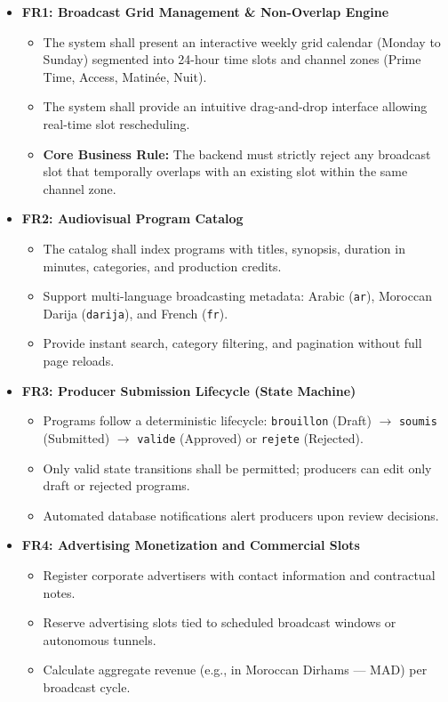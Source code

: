 \documentclass[12pt,a4paper,oneside]{report}
\begin{document}
\begin{itemize}
    \item \textbf{FR1: Broadcast Grid Management \& Non-Overlap Engine}
    \begin{itemize}
        \item The system shall present an interactive weekly grid calendar (Monday to Sunday) segmented into 24-hour time slots and channel zones (Prime Time, Access, Matinée, Nuit).
        \item The system shall provide an intuitive drag-and-drop interface allowing real-time slot rescheduling.
        \item \textbf{Core Business Rule:} The backend must strictly reject any broadcast slot that temporally overlaps with an existing slot within the same channel zone.
    \end{itemize}

    \item \textbf{FR2: Audiovisual Program Catalog}
    \begin{itemize}
        \item The catalog shall index programs with titles, synopsis, duration in minutes, categories, and production credits.
        \item Support multi-language broadcasting metadata: Arabic (\texttt{ar}), Moroccan Darija (\texttt{darija}), and French (\texttt{fr}).
        \item Provide instant search, category filtering, and pagination without full page reloads.
    \end{itemize}

    \item \textbf{FR3: Producer Submission Lifecycle (State Machine)}
    \begin{itemize}
        \item Programs follow a deterministic lifecycle: \texttt{brouillon} (Draft) $\rightarrow$ \texttt{soumis} (Submitted) $\rightarrow$ \texttt{valide} (Approved) or \texttt{rejete} (Rejected).
        \item Only valid state transitions shall be permitted; producers can edit only draft or rejected programs.
        \item Automated database notifications alert producers upon review decisions.
    \end{itemize}

    \item \textbf{FR4: Advertising Monetization and Commercial Slots}
    \begin{itemize}
        \item Register corporate advertisers with contact information and contractual notes.
        \item Reserve advertising slots tied to scheduled broadcast windows or autonomous tunnels.
        \item Calculate aggregate revenue (e.g., in Moroccan Dirhams --- MAD) per broadcast cycle.
    \end{itemize}


\end{itemize}
\end{document}
